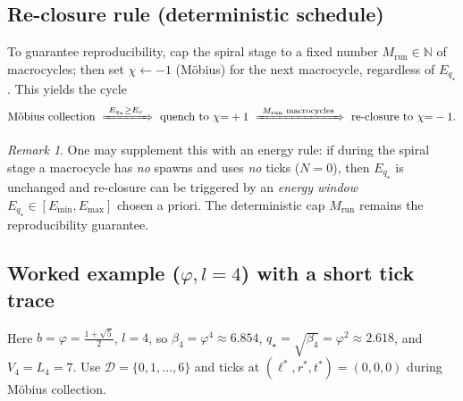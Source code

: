 \documentclass[11pt]{article}
\theoremstyle{definition}
\theoremstyle{remark}
\newtheorem{remark}[theorem]{Remark}
\newcommand{\N}{\mathbb{N}}
\begin{document}
\subsection*{Re-closure rule (deterministic schedule)}
To guarantee reproducibility, cap the spiral stage to a fixed number $M_{\mathrm{run}}\in\N$ of macrocycles; then set $\chi\leftarrow -1$ (M\"obius) for the next macrocycle, regardless of $E_{q_\star}$. This yields the cycle
\begin{equation*}
\text{M\"obius collection} \ \xRightarrow{\ E_{q_\star}\ge E_c\ }\ \text{quench to }\chi{=}+1
\ \xRightarrow{\ \text{$M_{\mathrm{run}}$ macrocycles}\ }\ \text{re-closure to }\chi{=}-1.
\end{equation*}
\begin{remark}
One may supplement this with an energy rule: if during the spiral stage a macrocycle has \emph{no} spawns and uses \emph{no} ticks ($N=0$), then $E_{q_\star}$ is unchanged and re-closure can be triggered by an \emph{energy window} $E_{q_\star}\in [E_{\min},E_{\max}]$ chosen a priori. The deterministic cap $M_{\mathrm{run}}$ remains the reproducibility guarantee.
\end{remark}

\subsection*{Worked example (\texorpdfstring{$\varphi,l=4$}{phi,l=4}) with a short tick trace}
Here $b=\varphi=\frac{1+\sqrt5}{2}$, $l=4$, so $\beta_4=\varphi^4\approx 6.854$, $q_\star=\sqrt{\beta_4}=\varphi^2\approx 2.618$, and $V_4=L_4=7$.
Use $\mathcal D=\{0,1,\dots,6\}$ and ticks at $(\ell^{*},r^{*},t^{*})=(0,0,0)$ during M\"obius collection.
\end{document}
